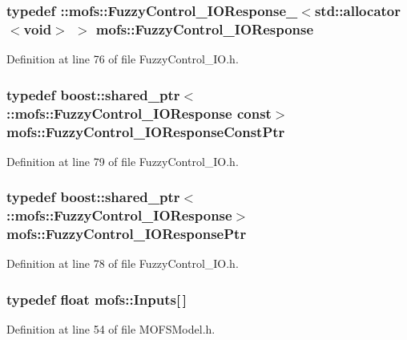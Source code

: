 \subsubsection[{Fuzzy\-Control\-\_\-\-I\-O\-Response}]{\setlength{\rightskip}{0pt plus 5cm}typedef \-::{\bf mofs\-::\-Fuzzy\-Control\-\_\-\-I\-O\-Response\-\_\-}$<$std\-::allocator$<$void$>$ $>$ {\bf mofs\-::\-Fuzzy\-Control\-\_\-\-I\-O\-Response}}\label{namespacemofs_a66e65626589260b72419fd6b0dc62136}


Definition at line 76 of file Fuzzy\-Control\-\_\-\-I\-O.\-h.

\subsubsection[{Fuzzy\-Control\-\_\-\-I\-O\-Response\-Const\-Ptr}]{\setlength{\rightskip}{0pt plus 5cm}typedef boost\-::shared\-\_\-ptr$<$ \-::{\bf mofs\-::\-Fuzzy\-Control\-\_\-\-I\-O\-Response} const$>$ {\bf mofs\-::\-Fuzzy\-Control\-\_\-\-I\-O\-Response\-Const\-Ptr}}\label{namespacemofs_abef426dcfb7065c07a5d04c5af5c9327}


Definition at line 79 of file Fuzzy\-Control\-\_\-\-I\-O.\-h.

\subsubsection[{Fuzzy\-Control\-\_\-\-I\-O\-Response\-Ptr}]{\setlength{\rightskip}{0pt plus 5cm}typedef boost\-::shared\-\_\-ptr$<$ \-::{\bf mofs\-::\-Fuzzy\-Control\-\_\-\-I\-O\-Response}$>$ {\bf mofs\-::\-Fuzzy\-Control\-\_\-\-I\-O\-Response\-Ptr}}\label{namespacemofs_a17fab7cc8a8bbdca524530eae2ff5242}


Definition at line 78 of file Fuzzy\-Control\-\_\-\-I\-O.\-h.

\subsubsection[{Inputs}]{\setlength{\rightskip}{0pt plus 5cm}typedef float mofs\-::\-Inputs[$\,$]}\label{namespacemofs_ace54d98e47518beccdea4c0a94975970}


Definition at line 54 of file M\-O\-F\-S\-Model.\-h.

